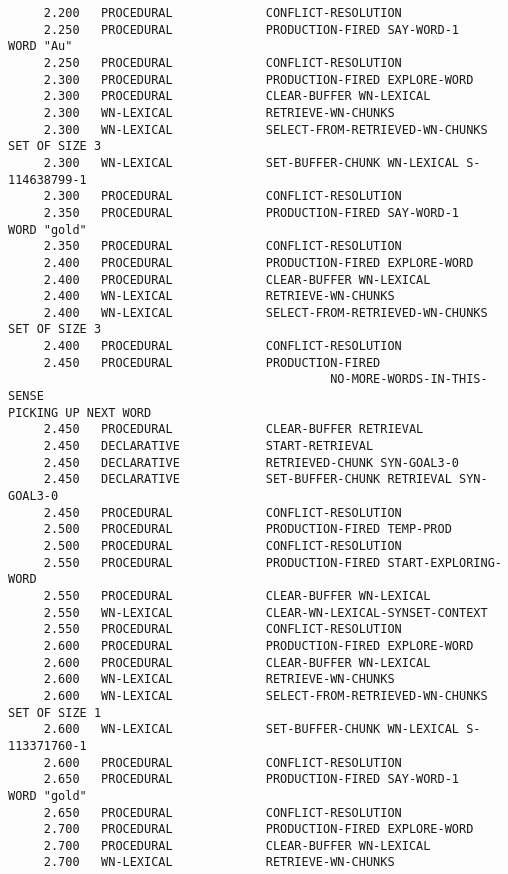\begin{verbatim}
     2.200   PROCEDURAL             CONFLICT-RESOLUTION 
     2.250   PROCEDURAL             PRODUCTION-FIRED SAY-WORD-1 
WORD "Au" 
     2.250   PROCEDURAL             CONFLICT-RESOLUTION 
     2.300   PROCEDURAL             PRODUCTION-FIRED EXPLORE-WORD 
     2.300   PROCEDURAL             CLEAR-BUFFER WN-LEXICAL 
     2.300   WN-LEXICAL             RETRIEVE-WN-CHUNKS 
     2.300   WN-LEXICAL             SELECT-FROM-RETRIEVED-WN-CHUNKS SET OF SIZE 3 
     2.300   WN-LEXICAL             SET-BUFFER-CHUNK WN-LEXICAL S-114638799-1 
     2.300   PROCEDURAL             CONFLICT-RESOLUTION 
     2.350   PROCEDURAL             PRODUCTION-FIRED SAY-WORD-1 
WORD "gold" 
     2.350   PROCEDURAL             CONFLICT-RESOLUTION 
     2.400   PROCEDURAL             PRODUCTION-FIRED EXPLORE-WORD 
     2.400   PROCEDURAL             CLEAR-BUFFER WN-LEXICAL 
     2.400   WN-LEXICAL             RETRIEVE-WN-CHUNKS 
     2.400   WN-LEXICAL             SELECT-FROM-RETRIEVED-WN-CHUNKS SET OF SIZE 3 
     2.400   PROCEDURAL             CONFLICT-RESOLUTION 
     2.450   PROCEDURAL             PRODUCTION-FIRED 
                                             NO-MORE-WORDS-IN-THIS-SENSE 
PICKING UP NEXT WORD 
     2.450   PROCEDURAL             CLEAR-BUFFER RETRIEVAL 
     2.450   DECLARATIVE            START-RETRIEVAL 
     2.450   DECLARATIVE            RETRIEVED-CHUNK SYN-GOAL3-0 
     2.450   DECLARATIVE            SET-BUFFER-CHUNK RETRIEVAL SYN-GOAL3-0 
     2.450   PROCEDURAL             CONFLICT-RESOLUTION 
     2.500   PROCEDURAL             PRODUCTION-FIRED TEMP-PROD 
     2.500   PROCEDURAL             CONFLICT-RESOLUTION 
     2.550   PROCEDURAL             PRODUCTION-FIRED START-EXPLORING-WORD 
     2.550   PROCEDURAL             CLEAR-BUFFER WN-LEXICAL 
     2.550   WN-LEXICAL             CLEAR-WN-LEXICAL-SYNSET-CONTEXT 
     2.550   PROCEDURAL             CONFLICT-RESOLUTION 
     2.600   PROCEDURAL             PRODUCTION-FIRED EXPLORE-WORD 
     2.600   PROCEDURAL             CLEAR-BUFFER WN-LEXICAL 
     2.600   WN-LEXICAL             RETRIEVE-WN-CHUNKS 
     2.600   WN-LEXICAL             SELECT-FROM-RETRIEVED-WN-CHUNKS SET OF SIZE 1 
     2.600   WN-LEXICAL             SET-BUFFER-CHUNK WN-LEXICAL S-113371760-1 
     2.600   PROCEDURAL             CONFLICT-RESOLUTION 
     2.650   PROCEDURAL             PRODUCTION-FIRED SAY-WORD-1 
WORD "gold" 
     2.650   PROCEDURAL             CONFLICT-RESOLUTION 
     2.700   PROCEDURAL             PRODUCTION-FIRED EXPLORE-WORD 
     2.700   PROCEDURAL             CLEAR-BUFFER WN-LEXICAL 
     2.700   WN-LEXICAL             RETRIEVE-WN-CHUNKS 

\end{verbatim}
